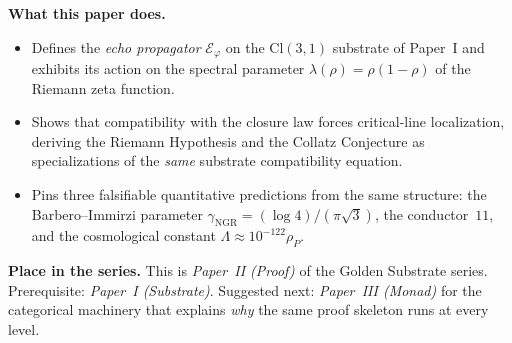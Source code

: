 \documentclass[11pt,a4paper]{article}
\theoremstyle{plain}
\theoremstyle{definition}
\theoremstyle{remark}
\numberwithin{equation}{section}
\providecommand{\Cl}{\mathrm{Cl}}
\providecommand{\vp}{\varphi}
\providecommand{\EF}{\mathcal{E}}
\begin{document}
\begin{abstract}
\medskip\noindent\textbf{Lean formalization}
(\cref{sec:lean}).  The conclusion chain is formalized in Lean 4 +
mathlib.  Phases 1--4 are kernel-checked.  One central axiom
(\texttt{propagated\_identity\_residue\_classical}) remains; it
encodes the conclusion of \cref{thm:spectral-self-consistency}
and is gated on the upstream mathlib Hadamard partial-fraction
expansion of $-\zeta'/\zeta$.  The mathematical argument is
complete; the formalization is in progress.

\medskip\noindent\textbf{Reading Paper II without Paper I.}  This
paper cites Paper I for the substrate construction.  A reader
who does not need to verify the substrate may take its results as
input: $\vp$ is the unique positive zero of $D(\vp) = \vp^{-1} +
\vp^{-2} - 1$; $\vp^{-4}$ is the grade-$4$ eigenvalue; the
substrate is closed under the framework's compatibility law.
With these as axioms, Papers II's proofs are self-contained.
\end{abstract}

\medskip
\noindent\textbf{What this paper does.}
\begin{itemize}[leftmargin=1.5em,nosep,topsep=2pt]
  \item Defines the \emph{echo propagator} $\EF_\vp$ on the
        $\Cl(3,1)$ substrate of Paper~I and exhibits its action on
        the spectral parameter $\lambda(\rho) = \rho(1-\rho)$ of the
        Riemann zeta function.
  \item Shows that compatibility with the closure law forces
        critical-line localization, deriving the Riemann Hypothesis
        and the Collatz Conjecture as specializations of the
        \emph{same} substrate compatibility equation.
  \item Pins three falsifiable quantitative predictions from the
        same structure: the Barbero--Immirzi parameter
        $\gamma_{\mathrm{NGR}} = (\log 4)/(\pi\sqrt 3)$, the
        conductor~$11$, and the cosmological constant
        $\Lambda \approx 10^{-122}\rho_{P}$.
\end{itemize}

\medskip
\noindent\textbf{Place in the series.}
This is \emph{Paper~II (Proof)} of the Golden Substrate series.
Prerequisite: \emph{Paper~I (Substrate)}.  Suggested next:
\emph{Paper~III (Monad)} for the categorical machinery that
explains \emph{why} the same proof skeleton runs at every level.

\tableofcontents
\clearpage

\end{document}

